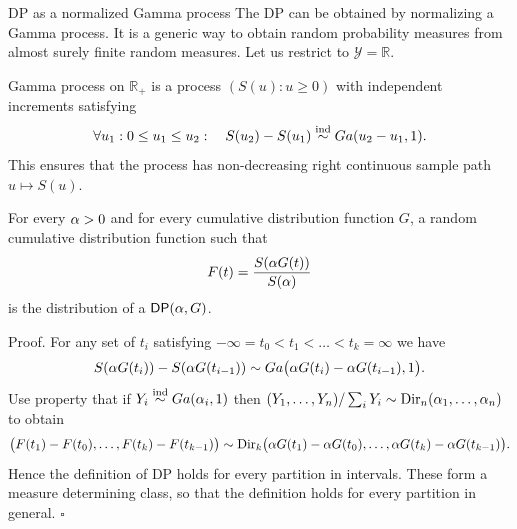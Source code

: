 \begin{frame}[allowframebreaks]{DP as a normalized Gamma process}
The DP can be obtained by \alert{normalizing a Gamma process}. It is a generic way to obtain random probability measures from almost surely finite random measures. Let us restrict to $\mathcal{Y}=\mathbb{R}$.
\begin{definition}
Gamma process on $\mathbb{R}_+$ is a process $(S(u):u \geq 0)$ with independent increments satisfying
\begin{equation*}
    \forall u_1: 0 \leq u_1 \leq u_2:\quad S(u_2) - S(u_1)\stackrel{\mbox{\scriptsize{ind}}}{\sim} Ga(u_2-u_1,1).
\end{equation*}
This ensures that the process has non-decreasing right continuous sample path $u\mapsto S(u)$.
\end{definition}

\begin{theorem}
For every $\alpha>0$ and for every cumulative distribution function $G$, a random cumulative distribution function such that
\begin{equation*}
    F(t) = \frac{S(\alpha G(t))}{S(\alpha)}
\end{equation*}
is the distribution of a $\mathsf{DP}(\alpha,G)$.
\end{theorem}

\alert{Proof.}
For any set of $t_i$ satisfying $-\infty = t_0 < t_1 < \ldots < t_k = \infty$ we have 
$$
S(\alpha G(t_i)) - S(\alpha G(t_{i-1})) \sim Ga\big( \alpha G(t_i)-\alpha G(t_{i-1}),1\big).
$$
Use property that if $Y_i \stackrel{\mbox{\scriptsize{ind}}}{\sim} Ga(\alpha_i, 1)$ then $(Y_1, \ldots, Y_n)/\sum_i Y_i \sim \text{Dir}_n (\alpha_1,\ldots, \alpha_n)$ to obtain 
$$
\big(F(t_1)-F(t_0), \ldots, F(t_k) - F(t_{k-1}) \big) \sim \text{Dir}_k\big(\alpha G(t_1) -\alpha G(t_0), \ldots, \alpha G(t_k) -\alpha G(t_{k-1})\big).
$$
Hence the definition of DP holds for every partition in intervals. These form a measure determining class, so that the definition holds for every partition in general. \hfill $\square$

\end{frame}






